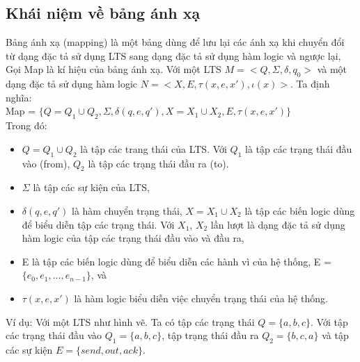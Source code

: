\documentclass{article}
\begin{document}
\begin{flushleft}
		\subsection{Khái niệm về bảng ánh xạ}
			Bảng ánh xạ (mapping) là một bảng dùng để lưu lại các ánh xạ khi chuyển đổi từ dạng đặc tả sử dụng LTS sang dạng đặc tả sử dụng hàm logic và ngược lại,\\
			Gọi Map là kí hiệu của bảng ánh xạ. Với một LTS $M = <Q, \Sigma, \delta, q_{0}>$ và một dạng đặc tả sử dụng hàm logic $N = <X, E, \tau(x, e, x'), \iota(x)>$. Ta định nghĩa:\\
			Map = $\{Q = Q_1 \cup Q_2, \Sigma, \delta(q, e, q'), X = X_1 \cup X_2, E, \tau(x, e, x')\}$\\
			Trong đó:\\
			\begin{itemize}
				\item $Q = Q_1 \cup Q_2$ là tập các trang thái của LTS. Với $Q_1$ là tập các trạng thái đầu vào (from), $Q_2$ là tập các trạng thái đầu ra (to).\\
				\item $\Sigma$ là tập các sự kiện của LTS,
				\item $\delta(q, e, q')$ là hàm chuyển trạng thái, $X = X_1 \cup X_2$ là tập các biến logic dùng để biểu diễn tập các trạng thái. Với $X_1$, $X_2$ lần lượt là dạng đặc tả sử dụng hàm logic của tập các trạng thái đầu vào và đầu ra,
				\item E là tập các biến logic dùng để biểu diễn các hành vì của hệ thống, E = $\{e_0, e_1, ..., e_{n-1}\}$, và
				\item $\tau(x, e, x')$ là hàm logic biểu diễn việc chuyển trạng thái của hệ thống.\\
			\end{itemize}
			Ví dụ: Với một LTS như hình vẽ. Ta có tập các trạng thái $Q = \{a, b, c\}$. Với tập các trạng thái đầu vào $Q_{1} = \{a, b, c\}$, tập trạng thái đầu ra $Q_{2} = \{b, c, a\}$ và tập các sự kiện $E = \{send, out, ack\}$.\\


\end{flushleft}
\end{document}
